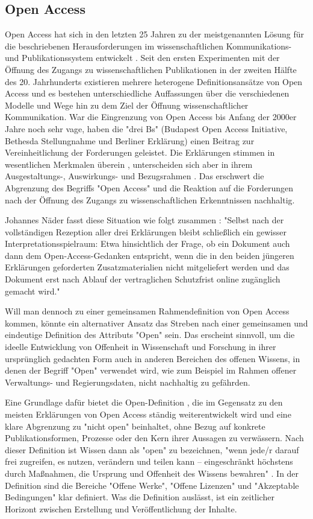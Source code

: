 \subsection{Open Access}

Open Access hat sich in den letzten 25 Jahren zu der meistgenannten Lösung für die beschriebenen Herausforderungen im wissenschaftlichen Kommunikations- und Publikationssystem entwickelt \cite{Brembs_2015}. Seit den ersten Experimenten mit der Öffnung des Zugangs zu wissenschaftlichen Publikationen in der zweiten Hälfte des 20. Jahrhunderts existieren mehrere heterogene Definitionsansätze von Open Access und es bestehen unterschiedliche Auffassungen über die verschiedenen Modelle und Wege hin zu dem Ziel der Öffnung wissenschaftlicher Kommunikation. War die Eingrenzung von Open Access bis Anfang der 2000er Jahre noch sehr vage, haben die "drei Bs" (Budapest Open Access Initiative, Bethesda Stellungnahme und Berliner Erklärung) einen Beitrag zur Vereinheitlichung der Forderungen geleistet. Die Erklärungen stimmen in wesentlichen Merkmalen überein \cite{Albert_2006}, unterscheiden sich aber in ihrem Ausgestaltungs-, Auswirkungs- und Bezugsrahmen \cite{Naeder_2010}. Das erschwert die Abgrenzung des Begriffs "Open Access" und die Reaktion auf die Forderungen nach der Öffnung des Zugangs zu wissenschaftlichen Erkenntnissen nachhaltig.

Johannes Näder fasst diese Situation wie folgt zusammen \cite{Naeder_2010}:
"Selbst nach der vollständigen Rezeption aller drei Erklärungen bleibt schließlich ein gewisser Interpretationsspielraum: Etwa hinsichtlich der Frage, ob ein Dokument auch dann dem Open-Access-Gedanken entspricht, wenn die in den beiden jüngeren Erklärungen geforderten Zusatzmaterialien nicht mitgeliefert werden und das Dokument erst nach Ablauf der vertraglichen Schutzfrist online zugänglich gemacht wird."

Will man dennoch zu einer gemeinsamen Rahmendefinition von Open Access kommen, könnte ein alternativer Ansatz das Streben nach einer gemeinsamen und eindeutige Definition des Attributs "Open" sein. Das erscheint sinnvoll, um die ideelle Entwicklung von Offenheit in Wissenschaft und Forschung in ihrer ursprünglich gedachten Form auch in anderen Bereichen des offenen Wissens, in denen der Begriff "Open" verwendet wird, wie zum Beispiel im Rahmen offener Verwaltungs- und Regierungsdaten, nicht nachhaltig zu gefährden.

Eine Grundlage dafür bietet die Open-Definition \cite{open_definition}, die im Gegensatz zu den meisten Erklärungen von Open Access ständig weiterentwickelt wird und eine klare Abgrenzung zu "nicht open" beinhaltet, ohne Bezug auf konkrete Publikationsformen, Prozesse oder den Kern ihrer Aussagen zu verwässern. Nach dieser Definition ist Wissen dann als "open" zu bezeichnen, "wenn jede/r darauf frei zugreifen, es nutzen, verändern und teilen kann – eingeschränkt höchstens durch Maßnahmen, die Ursprung und Offenheit des Wissens bewahren" \cite{open_definition}. In der Definition sind die Bereiche "Offene Werke", "Offene Lizenzen" und "Akzeptable Bedingungen" klar definiert. Was die Definition auslässt, ist ein zeitlicher Horizont zwischen Erstellung und Veröffentlichung der Inhalte.

